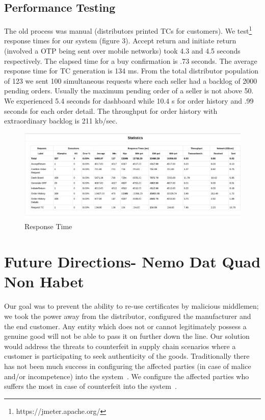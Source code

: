 \documentclass{article}
\begin{document}
\subsection{Performance Testing}
The old process was manual (distributors printed TCs for customers). We test\footnote{https://jmeter.apache.org/} response times for our system (figure 3). 
Accept return and initiate return (involved a OTP being sent over mobile networks) took 4.3 and 4.5 seconds respectively. The elapsed time for a buy confirmation is .73 seconds. The average response time for TC generation is 134 ms. From the total distributor population of 123 we sent 100 simultaneous requests where each seller had a backlog of 2000 pending orders. Usually the maximum pending order of a seller is not above 50. We experienced 5.4 seconds for dashboard while 10.4 s for order history and .99 seconds for each order detail. The throughput for order history with extraordinary backlog is 211 kb/sec.
\begin{figure}[ht]
\centering
\includegraphics[scale=0.20]{DealerR.png}
\caption{Response Time}
\end{figure}

\section{Future Directions- Nemo Dat Quad Non Habet}\label{quality}
Our goal was to prevent the ability to re-use certificates by malicious middlemen; we took the power away from the distributor, configured the manufacturer and the end customer. Any entity which does not or cannot legitimately possess a genuine good will not be able to pass it on further down the line. Our solution would address the threats to counterfeit in supply chain scenarios where a customer is participating to seek authenticity of the goods. Traditionally there has not been much success in configuring the affected parties (in case of malice and/or incompetence) into the system~\cite{ross}. We configure the affected parties who suffers the most in case of counterfeit into the system~\cite{pdc2010}. 
\end{document}
